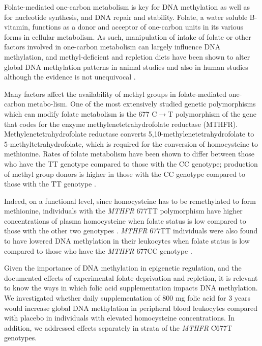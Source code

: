 \noindent Folate-mediated one-carbon metabolism is key for DNA methylation as well as for nucleotide synthesis, and DNA repair and stability. Folate, a water soluble B-vitamin, functions as a donor and acceptor of one-carbon units in its various forms in cellular metabolism. As such, manipulation of intake of folate or other factors involved in one-carbon metabolism can largely influence DNA methylation, and methyl-deficient and repletion diets have been shown to alter global DNA methylation patterns in animal studies \cite{c47} and also in human studies \cite{c48,c49} although the evidence is not unequivocal \cite{c410,c411}.

\noindent Many factors affect the availability of methyl groups in folate-mediated one-carbon metabo-lism. One of the most extensively studied genetic polymorphisms which can modify folate metabolism is the 677 C$\rightarrow$T polymorphism of the gene that codes for the enzyme methylenetetrahydrofolate reductase (MTHFR). Methylenetetrahydrofolate reductase converts 5,10-methylenetetrahydrofolate to 5-methyltetrahydrofolate, which is required for the conversion of homocysteine to methionine. Rates of folate metabolism have been shown to differ between those who have the TT genotype compared to those with the CC genotype; production of methyl group donors is higher in those with the CC genotype compared to those with the TT genotype \cite{c412}.

\noindent Indeed, on a functional level, since homocysteine has to be remethylated to form methionine, individuals with the \emph{MTHFR} 677TT polymorphism have higher concentrations of plasma homocysteine when folate status is low compared to those with the other two genotypes \cite{c413,c414}. \emph{MTHFR} 677TT individuals were also found to have lowered DNA methylation in their leukocytes when folate status is low compared to those who have the \emph{MTHFR} 677CC genotype \cite{c415}.

\noindent Given the importance of DNA methylation in epigenetic regulation, and the documented effects of experimental folate deprivation and repletion, it is relevant to know the ways in which folic acid supplementation impacts DNA methylation. We investigated whether daily supplementation of 800 mg folic acid for 3 years would increase global DNA methylation in peripheral blood leukocytes compared with placebo in individuals with elevated homocysteine concentrations. In addition, we addressed effects separately in strata of the \emph{MTHFR} C677T genotypes.

